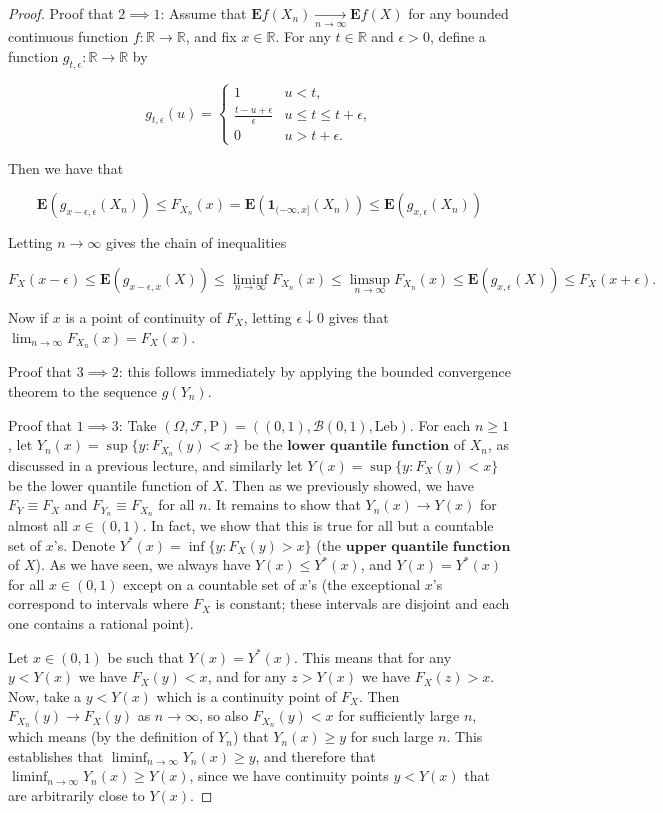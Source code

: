 \documentclass[11pt]{report}
\providecommand{\cal}{\mathcal}
\newcommand{\R}{\mathbb{R}}
\theoremstyle{plain}
\theoremstyle{definition}
\begin{document}
\begin{proof}
Proof that $2\implies 1$: Assume that
$\mathbf{E} f(X_n) \xrightarrow[n\to\infty]{}
\mathbf{E} f(X)$
for any bounded continuous function $f:\R\to\R$, and
fix $x\in \R$. For any $t\in \R$ and $\epsilon>0$,
define a function $g_{t,\epsilon}:\R\to\R$ by

\[
g_{t,\epsilon}(u) = \begin{cases}
1 & u<t, \\
\frac{t-u+\epsilon}{\epsilon} & u \le t \le t+\epsilon, \\
0 & u>t+\epsilon.
\end{cases}
\]

Then we have that

\[
\mathbf{E} (g_{x-\epsilon,\epsilon}(X_n)) \le F_{X_n}(x) = \mathbf{E}(\mathbf{1}_{(-\infty,x]}(X_n)) \le \mathbf{E}(g_{x,\epsilon}(X_n))
\]

Letting $n\to\infty$ gives the chain of inequalities

\[
F_{X}(x-\epsilon) \le \mathbf{E}(g_{x-\epsilon,x}(X)) \le \liminf_{n\to\infty} F_{X_n}(x) \le \limsup_{n\to\infty}
F_{X_n}(x) \le \mathbf{E}(g_{x,\epsilon}(X)) \le F_X(x+\epsilon).
\]

Now if $x$ is a point of continuity of $F_X$,
letting $\epsilon \downarrow 0$ gives that
$\lim_{n\to\infty}F_{X_n}(x) = F_X(x)$.

Proof that $3\implies 2$: this follows immediately by
applying the bounded convergence theorem to the
sequence $g(Y_n)$.

Proof that $1 \implies 3$: Take
$(\Omega,{\cal F},\mathrm{P}) = ((0,1),{\cal B}(0,1),
\textrm{Leb})$.
For each $n\ge 1$, let
$Y_n(x) = \sup\{ y : F_{X_n}(y) < x \}$ be the
$\textbf{lower quantile function}$ of $X_n$, as
discussed in a previous lecture, and similarly let
$Y(x)=\sup\{ y : F_X(y)<x\}$ be the lower quantile
function of $X$. Then as we previously showed, we
have $F_Y \equiv F_X$ and $F_{Y_n}\equiv F_{X_n}$ for
all $n$. It remains to show that $Y_n(x)\to Y(x)$ for
almost all $x\in(0,1)$. In fact, we show that this is
true for all but a countable set of $x$'s. Denote
$Y^*(x) = \inf\{ y : F_X(y)>x\}$ (the
$\textbf{upper quantile function}$ of $X$). As we
have seen, we always have $Y(x) \le Y^*(x)$, and
$Y(x) = Y^*(x)$ for all $x\in(0,1)$ except on a
countable set of $x$'s (the exceptional $x$'s
correspond to intervals where $F_X$ is constant;
these intervals are disjoint and each one contains a
rational point).

Let $x\in(0,1)$ be such that $Y(x)=Y^*(x)$. This
means that for any $y<Y(x)$ we have $F_X(y)<x$, and
for any $z>Y(x)$ we have $F_X(z)>x$. Now, take a
$y<Y(x)$ which is a continuity point of $F_X$. Then
$F_{X_n}(y)\to F_X(y)$ as $n\to\infty$, so also
$F_{X_n}(y)< x$ for sufficiently large $n$, which
means (by the definition of $Y_n$) that $Y_n(x)\ge y$
for such large $n$. This establishes that
$\liminf_{n\to\infty} Y_n(x)\ge y$, and therefore
that $\liminf_{n\to\infty} Y_n(x)\ge Y(x)$, since we
have continuity points $y<Y(x)$ that are arbitrarily
close to $Y(x)$.


\end{proof}
\end{document}
